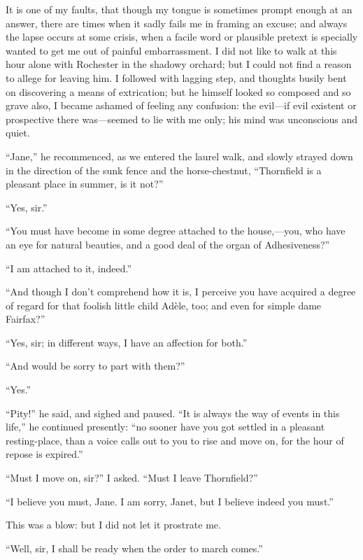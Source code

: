 It is one of my faults, that though my tongue is sometimes prompt enough
at an answer, there are times when it sadly fails me in framing an
excuse; and always the lapse occurs at some crisis, when a facile word
or plausible pretext is specially wanted to get me out of painful
embarrassment. I did not like to walk at this hour alone with \Mr{}
Rochester in the shadowy orchard; but I could not find a reason to
allege for leaving him. I followed with lagging step, and thoughts
busily bent on discovering a means of extrication; but he himself looked
so composed and so grave also, I became ashamed of feeling any
confusion: the evil---if evil existent or prospective there was---seemed
to lie with me only; his mind was unconscious and quiet.

\enquote{Jane,} he recommenced, as we entered the laurel walk, and
slowly strayed down in the direction of the sunk fence and the
horse-chestnut, \enquote{Thornfield is a pleasant place in summer, is it
	not?}

\enquote{Yes, sir.}

\enquote{You must have become in some degree attached to the
	house,---you, who have an eye for natural beauties, and a good deal of
	the organ of Adhesiveness?}

\enquote{I am attached to it, indeed.}

\enquote{And though I don't comprehend how it is, I perceive you have
	acquired a degree of regard for that foolish little child Adèle, too;
	and even for simple dame Fairfax?}

\enquote{Yes, sir; in different ways, I have an affection for both.}

\enquote{And would be sorry to part with them?}

\enquote{Yes.}

\enquote{Pity!} he said, and sighed and paused. \enquote{It is always
	the way of events in this life,} he continued presently: \enquote{no
	sooner have you got settled in a pleasant resting-place, than a voice
	calls out to you to rise and move on, for the hour of repose is
	expired.}

\enquote{Must I move on, sir?} I asked. \enquote{Must I leave
	Thornfield?}

\enquote{I believe you must, Jane. I am sorry, Janet, but I believe
	indeed you must.}

This was a blow: but I did not let it prostrate me.

\enquote{Well, sir, I shall be ready when the order to march comes.}

